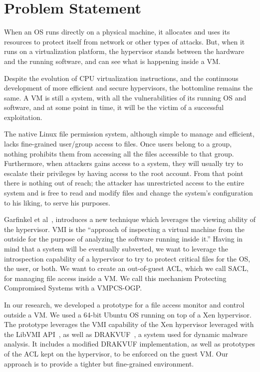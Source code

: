 \section{Problem Statement}\label{sec:problem} 
When an \ac{OS} runs directly on a physical machine, it allocates and uses its resources to protect itself from network or other types of attacks. But, when it runs on a virtualization platform, the hypervisor stands between the hardware and the running software, and can see what is happening inside a \ac{VM}. 

\par Despite the evolution of \ac{CPU} virtualization instructions, and the continuous development of more efficient and secure hypervisors, the bottomline remains the same. A \ac{VM} is still a system, with all the vulnerabilities of its running \ac{OS} and software, and at some point in time, it will be the victim of a successful exploitation. 

\par The native Linux file permission system, although simple to manage and efficient, lacks fine-grained user/group access to files. Once users belong to a group, nothing prohibits them from accessing all the files accessible to that group. Furthermore, when attackers gains access to a system, they will usually try to escalate their privileges by having access to the root account. From that point there is nothing out of reach; the attacker has unrestricted access to the entire system and is free to read and modify files and change the system's configuration to his liking, to serve his purposes.

\par Garfinkel et al~\cite{garfinkel2003virtual}, introduces a new technique which leverages the viewing ability of the hypervisor. \ac{VMI} is the “approach of inspecting a virtual machine from the outside for the purpose of analyzing the software running inside it.” Having in mind that a system will be eventually subverted, we want to leverage the introspection capability of a hypervisor to try to protect critical files for the OS, the user, or both. We want to create an out-of-guest \ac{ACL}, which we call \ac{SACL}, for managing file access inside a VM. We call this mechanism Protecting Compromised Systems with a \ac{VMPCS-OGP}.

\par In our research, we developed a prototype for a file access monitor and control outside a \ac{VM}. We used a 64-bit Ubuntu OS running on top of a Xen hypervisor. The prototype leverages the \ac{VMI} capability of the Xen hypervisor leveraged with the LibVMI \ac{API}~\cite{payne2011libvmi}, as well as DRAKVUF~\cite{lengyel2014drakvuf}, a system used for dynamic malware analysis. It includes a modified DRAKVUF implementation, as well as prototypes of the \ac{ACL} kept on the hypervisor, to be enforced on the guest \ac{VM}. Our approach is to provide a tighter but fine-grained environment.

